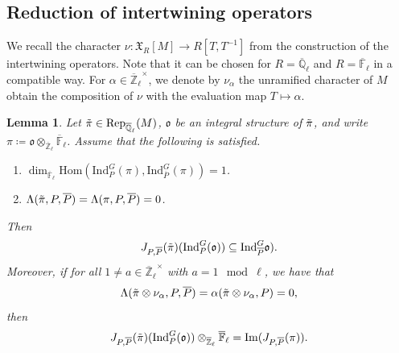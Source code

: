 \documentclass[10pt,a4paper]{article}
\newtheorem{lemma}{Lemma}
\theoremstyle{remark}
\theoremstyle{definition}
\newcommand{\fl}{{\overline{\mathbb{F}}_\ell}}
\newcommand{\ql}{{\overline{\mathbb{Q}}_\ell}}
\newcommand{\zl}{{\overline{\mathbb{Z}}_\ell}}
\newcommand{\rep}{\mathrm{Rep}}
\newcommand{\ip}{\mathrm{Ind}_P^G}
\newcommand{\df}{\dim_\fl}
\newcommand{\ho}{\mathrm{Hom}}
\newcommand{\bl}{\otimes_\zl\fl}
\newcommand{\im}{\mathrm{Im}}
\newcommand{\op}{\overline{P}}
\newcommand{\id}{\mathrm{Ind}}
\newcommand{\xc}{\mathfrak{X}}
\newcommand{\fo}{\mathfrak{o}}
\newcommand{\ra}{\rightarrow}
\newcommand{\tpi}{\Tilde{\pi}}
\begin{document}
\subsection{Reduction of intertwining operators}
We recall the character $\nu\colon\xc_R[M]\ra R[T,T^{-1}]$ from the construction of the intertwining operators. Note that it can be chosen for $R=\ql$ and $R=\fl$ in a compatible way.
For $\alpha\in\zl^\times$, we denote by $\nu_\alpha$ the unramified character of $M$ obtain the composition of $\nu$ with the evaluation map $T\mapsto \alpha$.
\begin{lemma}\label{L:ratJ}
    Let $\tpi\in\rep_\ql(M)$, $\fo$ be an integral structure of $\tpi$, and write $\pi\coloneqq\fo\bl$. Assume that the following is satisfied.
    \begin{enumerate}
        \item $\df\ho(\ip(\pi),\id_{\op}^G(\pi))=1$.
        \item $\Lambda(\tpi,P,\op)=\Lambda(\pi,P,\op)=0$.
    \end{enumerate}
    Then \[J_{P,\overline{P}}(\tpi)(\ip(\fo))\subseteq \id_{\op}^G\fo).\]
    Moreover, if for all $1\neq a\in\zl^\times$ with $a=1\mod\ell$, we have that \[\Lambda(\tpi\otimes\nu_\alpha,P,\op)=\alpha(\tpi\otimes\nu_\alpha,P)=0,\] then \[J_{P,\overline{P}}(\tpi)(\ip(\fo))\bl=\im(J_{P,\op}(\pi)).\]
\end{lemma}
\end{document}
